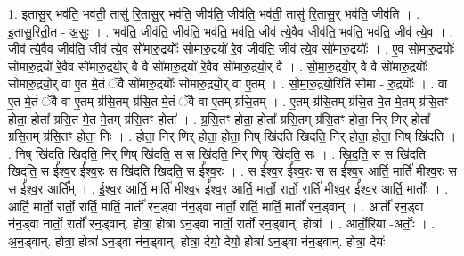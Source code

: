 \documentclass[17pt]{extarticle}
\begin{document}
1. इ॒तासु॒र् भव॑ति॒ भव॑ती॒ तासु॑ रि॒तासु॒र् भव॑ति॒ जीव॑ति॒ जीव॑ति॒ भव॑ती॒ तासु॑ रि॒तासु॒र् भव॑ति॒ जीव॑ति । . इ॒तासु॒रिती॒त - अ॒सुः॒ । . भव॑ति॒ जीव॑ति॒ जीव॑ति॒ भव॑ति॒ भव॑ति॒ जीव॑ त्ये॒वैव जीव॑ति॒ भव॑ति॒ भव॑ति॒ जीव॑ त्ये॒व । . जीव॑ त्ये॒वैव जीव॑ति॒ जीव॑ त्ये॒व सो॑मारु॒द्रयोः᳚ सोमारु॒द्रयो॑ रे॒व जीव॑ति॒ जीव॑ त्ये॒व सो॑मारु॒द्रयोः᳚ । . ए॒व सो॑मारु॒द्रयोः᳚ सोमारु॒द्रयो॑ रे॒वैव सो॑मारु॒द्रयो॒र् वै वै सो॑मारु॒द्रयो॑ रे॒वैव सो॑मारु॒द्रयो॒र् वै । . सो॒मा॒रु॒द्रयो॒र् वै वै सो॑मारु॒द्रयोः᳚ सोमारु॒द्रयो॒र् वा ए॒त मे॒तं ॅवै सो॑मारु॒द्रयोः᳚ सोमारु॒द्रयो॒र् वा ए॒तम् । . सो॒मा॒रु॒द्रयो॒रिति॑ सोमा - रु॒द्रयोः᳚ । . वा ए॒त मे॒तं ॅवै वा ए॒तम् ग्र॑सि॒तम् ग्र॑सि॒त मे॒तं ॅवै वा ए॒तम् ग्र॑सि॒तम् । . ए॒तम् ग्र॑सि॒तम् ग्र॑सि॒त मे॒त मे॒तम् ग्र॑सि॒तꣳ होता॒ होता᳚ ग्रसि॒त मे॒त मे॒तम् ग्र॑सि॒तꣳ होता᳚ । . ग्र॒सि॒तꣳ होता॒ होता᳚ ग्रसि॒तम् ग्र॑सि॒तꣳ होता॒ निर् णिर् होता᳚ ग्रसि॒तम् ग्र॑सि॒तꣳ होता॒ निः । . होता॒ निर् णिर् होता॒ होता॒ निष् खि॑दति खिदति॒ निर् होता॒ होता॒ निष् खि॑दति । . निष् खि॑दति खिदति॒ निर् णिष् खि॑दति॒ स स खि॑दति॒ निर् णिष् खि॑दति॒ सः । . खि॒द॒ति॒ स स खि॑दति खिदति॒ स ई᳚श्व॒र ई᳚श्व॒रः स खि॑दति खिदति॒ स ई᳚श्व॒रः । . स ई᳚श्व॒र ई᳚श्व॒रः स स ई᳚श्व॒र आर्ति॒ मार्ति॑ मीश्व॒रः स स ई᳚श्व॒र आर्ति᳚म् । . ई॒श्व॒र आर्ति॒ मार्ति॑ मीश्व॒र ई᳚श्व॒र आर्ति॒ मार्तो॒ रार्तो॒ रार्ति॑ मीश्व॒र ई᳚श्व॒र आर्ति॒ मार्तोः᳚ । . आर्ति॒ मार्तो॒ रार्तो॒ रार्ति॒ मार्ति॒ मार्तो॑ रन॒ड्वा न॑न॒ड्वा नार्तो॒ रार्ति॒ मार्ति॒ मार्तो॑ रन॒ड्वान् । . आर्तो॑ रन॒ड्वा न॑न॒ड्वा नार्तो॒ रार्तो॑ रन॒ड्वान्. होत्रा॒ होत्रा॑ ऽन॒ड्वा नार्तो॒ रार्तो॑ रन॒ड्वान्. होत्रा᳚ । . आर्तो॒रिया -अर्तोः॒ । . अ॒न॒ड्वान्. होत्रा॒ होत्रा॑ ऽन॒ड्वा न॑न॒ड्वान्. होत्रा॒ देयो॒ देयो॒ होत्रा॑ ऽन॒ड्वा न॑न॒ड्वान्. होत्रा॒ देयः॑ । \newline
\end{document}
